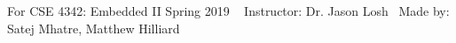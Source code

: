 For C\+SE 4342\+: Embedded II Spring 2019 ~\newline
 Instructor\+: Dr. Jason Losh~\newline
 Made by\+: Satej Mhatre, Matthew Hilliard 